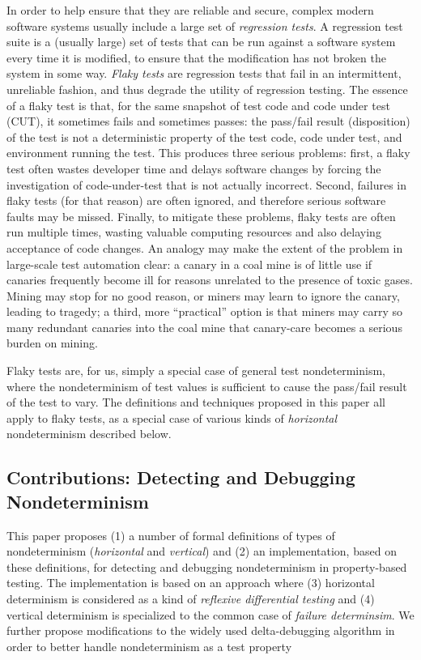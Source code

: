 In order to help ensure that they are reliable and secure, complex
modern software systems usually include a large set of
\emph{regression tests}.  A regression test suite is a (usually large)
set of tests that can be run against a software system every time it
is modified, to ensure that the modification has not broken the system
in some way.  \emph{Flaky tests} \cite{miccoflaky} are regression
tests that fail in an intermittent, unreliable fashion, and thus
degrade the utility of regression testing.  The essence of a flaky
test is that, for the same snapshot of test code and code under test
(CUT), it sometimes fails and sometimes passes: the pass/fail result (disposition) of the
test is not a deterministic property of the test code, code under
test, and environment running the test.  This produces three serious
problems: first, a flaky test often wastes developer time and delays
software changes by forcing the investigation of code-under-test that
is not actually incorrect.  Second, failures in flaky tests (for that
reason) are often ignored, and therefore serious software faults may
be missed.  Finally, to mitigate these problems, flaky tests are often
run multiple times, wasting valuable computing resources and also
delaying acceptance of code changes.  An analogy may make the extent
of the problem in large-scale test automation clear:  a canary in a coal mine is of
little use if canaries frequently become ill for reasons unrelated to
the presence of toxic gases.  Mining may stop for no good reason, or
miners may learn to ignore the canary, leading to tragedy; a third,
more ``practical'' option is that miners may carry so many redundant
canaries into the coal mine that canary-care becomes a serious burden
on mining.

Flaky tests are, for us, simply a special case of general test
nondeterminism, where the nondeterminism of test values is sufficient
to cause the pass/fail result of the test to vary.  The definitions
and techniques proposed in this paper all apply to flaky tests, as a
special case of various kinds of \emph{horizontal} nondeterminism described below.

\subsection{Contributions:  Detecting and Debugging Nondeterminism}


This paper proposes (1) a number of formal definitions of types of
nondeterminism (\emph{horizontal} and \emph{vertical}) and (2) an implementation, based on these definitions, for detecting and debugging
nondeterminism in property-based testing.  The implementation is based
on an approach where (3) horizontal determinism is considered as a
kind of \emph{reflexive differential testing} and (4) vertical
determinism is specialized to the common case of \emph{failure determinsim}.
We further propose modifications to the widely used delta-debugging algorithm in order to better handle
nondeterminism as a test property

